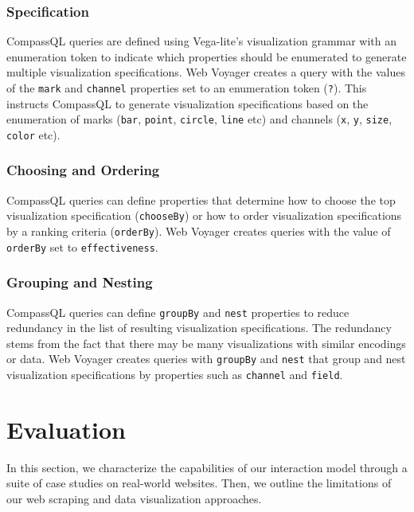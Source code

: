 \documentclass{vgtc}                          %
\begin{document}
\subsubsection{Specification}

CompassQL queries are defined using Vega-lite's visualization grammar
with an enumeration token to indicate which properties should be
enumerated to generate multiple visualization specifications. Web
Voyager creates a query with the values of the \texttt{mark} and
\texttt{channel} properties set to an enumeration token (\texttt{?}).
This instructs CompassQL to generate visualization specifications based
on the enumeration of marks (\texttt{bar}, \texttt{point},
\texttt{circle}, \texttt{line} etc) and channels (\texttt{x},
\texttt{y}, \texttt{size}, \texttt{color} etc).

\subsubsection{Choosing and Ordering}

CompassQL queries can define properties that determine how to choose the
top visualization specification (\texttt{chooseBy}) or how to order
visualization specifications by a ranking criteria (\texttt{orderBy}).
Web Voyager creates queries with the value of \texttt{orderBy} set to
\texttt{effectiveness}.

\subsubsection{Grouping and Nesting}

CompassQL queries can define \texttt{groupBy} and \texttt{nest}
properties to reduce redundancy in the list of resulting visualization
specifications. The redundancy stems from the fact that there may be
many visualizations with similar encodings or data. Web Voyager creates
queries with \texttt{groupBy} and \texttt{nest} that group and nest
visualization specifications by properties such as \texttt{channel} and
\texttt{field}.

\section{Evaluation} \label{evaluation}

In this section, we characterize the capabilities of our interaction
model through a suite of case studies on real-world websites. Then, we
outline the limitations of our web scraping and data visualization
approaches.
\end{document}
